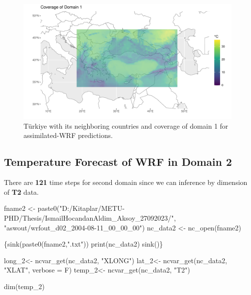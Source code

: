 \documentclass[
  letterpaper,
  DIV=11,
  numbers=noendperiod,
  abstract]{scrartcl}
\newenvironment{Shaded}{\begin{snugshade}}{\end{snugshade}}
\newcommand{\AttributeTok}[1]{\textcolor[rgb]{0.40,0.45,0.13}{#1}}
\newcommand{\FunctionTok}[1]{\textcolor[rgb]{0.28,0.35,0.67}{#1}}
\newcommand{\NormalTok}[1]{\textcolor[rgb]{0.00,0.23,0.31}{#1}}
\newcommand{\OtherTok}[1]{\textcolor[rgb]{0.00,0.23,0.31}{#1}}
\newcommand{\StringTok}[1]{\textcolor[rgb]{0.13,0.47,0.30}{#1}}
\begin{document}
\begin{figure}[H]

{\centering \includegraphics{WRF_pdf_files/figure-pdf/fig-domain1-1.pdf}

}

\caption{\label{fig-domain1}Türkiye with its neighboring countries and
coverage of domain 1 for assimilated-WRF predictions.}

\end{figure}

\hypertarget{temperature-forecast-of-wrf-in-domain-2}{%
\subsection{Temperature Forecast of WRF in Domain
2}\label{temperature-forecast-of-wrf-in-domain-2}}

There are \textbf{121} time steps for second domain since we can
inference by dimension of \textbf{T2} data.

\begin{Shaded}
\begin{Highlighting}[]
\NormalTok{fname2 }\OtherTok{\textless{}{-}} \FunctionTok{paste0}\NormalTok{(}\StringTok{"D:/Kitaplar/METU{-}PHD/Thesis/IsmailHocandanAldim\_Aksoy\_27092023/"}\NormalTok{,}
\StringTok{"aswout/wrfout\_d02\_2004{-}08{-}11\_00\_00\_00"}\NormalTok{)}
\NormalTok{nc\_data2 }\OtherTok{\textless{}{-}} \FunctionTok{nc\_open}\NormalTok{(fname2)}

\NormalTok{\{}\FunctionTok{sink}\NormalTok{(}\FunctionTok{paste0}\NormalTok{(fname2,}\StringTok{".txt"}\NormalTok{))}
  \FunctionTok{print}\NormalTok{(nc\_data2)}
  \FunctionTok{sink}\NormalTok{()\}}

\NormalTok{long\_2}\OtherTok{\textless{}{-}} \FunctionTok{ncvar\_get}\NormalTok{(nc\_data2, }\StringTok{"XLONG"}\NormalTok{)}
\NormalTok{lat\_2}\OtherTok{\textless{}{-}} \FunctionTok{ncvar\_get}\NormalTok{(nc\_data2, }\StringTok{"XLAT"}\NormalTok{, }\AttributeTok{verbose =}\NormalTok{ F)}
\NormalTok{temp\_2}\OtherTok{\textless{}{-}} \FunctionTok{ncvar\_get}\NormalTok{(nc\_data2, }\StringTok{"T2"}\NormalTok{) }

\FunctionTok{dim}\NormalTok{(temp\_2)}
\end{Highlighting}
\end{Shaded}
\end{document}

